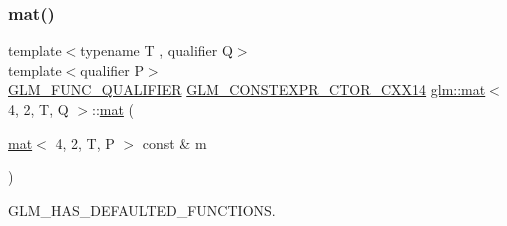 \mbox{\label{structglm_1_1mat_3_014_00_012_00_01_t_00_01_q_01_4_a780dbdda12c004d1894b31daede7e9ce}} 
\subsubsection{\texorpdfstring{mat()}{mat()}\hspace{0.1cm}{\footnotesize\ttfamily [18/21]}}
{\footnotesize\ttfamily template$<$typename T , qualifier Q$>$ \\
template$<$qualifier P$>$ \\
\mbox{\hyperlink{setup_8hpp_a33fdea6f91c5f834105f7415e2a64407}{G\+L\+M\+\_\+\+F\+U\+N\+C\+\_\+\+Q\+U\+A\+L\+I\+F\+I\+ER}} \mbox{\hyperlink{setup_8hpp_a0900f9145e68bf6061b6f5e7be3fa751}{G\+L\+M\+\_\+\+C\+O\+N\+S\+T\+E\+X\+P\+R\+\_\+\+C\+T\+O\+R\+\_\+\+C\+X\+X14}} \mbox{\hyperlink{structglm_1_1mat}{glm\+::mat}}$<$ 4, 2, T, Q $>$\+::\mbox{\hyperlink{structglm_1_1mat}{mat}} (\begin{DoxyParamCaption}\item[{\mbox{\hyperlink{structglm_1_1mat}{mat}}$<$ 4, 2, T, P $>$ const \&}]{m }\end{DoxyParamCaption})}



G\+L\+M\+\_\+\+H\+A\+S\+\_\+\+D\+E\+F\+A\+U\+L\+T\+E\+D\+\_\+\+F\+U\+N\+C\+T\+I\+O\+NS. 

\mbox{\label{structglm_1_1mat_3_014_00_012_00_01_t_00_01_q_01_4_abafe54829e43297a21e26ae004aa8db0}} 

